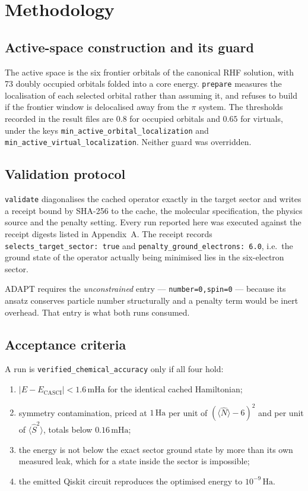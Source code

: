 \documentclass[11pt,a4paper]{article}
\newcommand{\mHa}{\ensuremath{\,\mathrm{mHa}}}
\newcommand{\Ha}{\ensuremath{\,\mathrm{Ha}}}
\newcommand{\Ssq}{\ensuremath{\langle \hat{S}^2 \rangle}}
\newcommand{\Nop}{\ensuremath{\langle \hat{N} \rangle}}
\newcommand{\code}[1]{\texttt{\small #1}}
\begin{document}
\section{Methodology}

\subsection{Active-space construction and its guard}

The active space is the six frontier orbitals of the canonical RHF solution,
with 73 doubly occupied orbitals folded into a core energy. \code{prepare}
measures the localisation of each selected orbital rather than assuming it, and
refuses to build if the frontier window is delocalised away from the
$\pi$ system. The thresholds recorded in the result files are $0.8$ for
occupied orbitals and $0.65$ for virtuals, under the keys
\code{min\_active\_orbital\_localization} and
\code{min\_active\_virtual\_localization}. Neither guard was overridden.

\subsection{Validation protocol}

\code{validate} diagonalises the cached operator exactly in the target sector
and writes a receipt bound by SHA-256 to the cache, the molecular specification,
the physics source and the penalty setting. Every run reported here was executed
against the receipt digests listed in Appendix~A. The receipt records
\code{selects\_target\_sector: true} and
\code{penalty\_ground\_electrons: 6.0}, i.e.\ the ground state of the operator
actually being minimised lies in the six-electron sector.

ADAPT requires the \emph{unconstrained} entry --- \code{number=0,spin=0} ---
because its ansatz conserves particle number structurally and a penalty term
would be inert overhead. That entry is what both runs consumed.

\subsection{Acceptance criteria}
\label{sec:criteria}

A run is \code{verified\_chemical\_accuracy} only if all four hold:

\begin{enumerate}[leftmargin=1.4em,itemsep=0.15em]
\item $|E - E_{\mathrm{CASCI}}| < 1.6\mHa$ for the identical cached
  Hamiltonian;
\item symmetry contamination, priced at $1\Ha$ per unit of
  $(\Nop - 6)^2$ and per unit of $\Ssq$, totals below $0.16\mHa$;
\item the energy is not below the exact sector ground state by more than its own
  measured leak, which for a state inside the sector is impossible;
\item the emitted Qiskit circuit reproduces the optimised energy to
  $10^{-9}\Ha$.
\end{enumerate}
\end{document}
